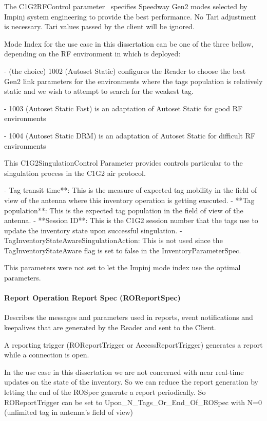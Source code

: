 The C1G2RFControl parameter~\cite[sec. 3.1.4]{ImpinjOctaneLLRP} specifies Speedway Gen2 modes selected by Impinj system engineering to provide the best performance. No Tari adjustment is necessary. Tari values passed by the client will be ignored.

Mode Index for the use case in this dissertation can be one of the three bellow, depending on the RF environment in which is deployed: 

- (the choice) 1002 (Autoset Static) configures the Reader to choose the best Gen2 link parameters for the environments where the tags population is relatively static and we wish to attempt to search for the weakest tag.

- 1003 (Autoset Static Fast) is an adaptation of Autoset Static for good RF environments

- 1004 (Autoset Static DRM) is an adaptation of Autoset Static for difficult RF environments

This C1G2SingulationControl Parameter provides controls particular to the singulation process in the C1G2 air protocol.

- Tag transit time**: This is the measure of expected tag mobility in the field of view of the antenna where this inventory operation is getting executed.
- **Tag population**: This is the expected tag population in the field of view of the antenna.
- **Session ID**: This is the C1G2 session number that the tags use to update the inventory state upon successful singulation.
- TagInventoryStateAwareSingulationAction: This is not used since the TagInventoryStateAware flag is set to false in the InventoryParameterSpec.

This parameters were not set to let the Impinj mode index use the optimal parameters.

\paragraph{Report Operation Report Spec (ROReportSpec)}

Describes the messages and parameters used in reports, event notifications and keepalives that are generated by the Reader and sent to the Client.

A reporting trigger (ROReportTrigger or AccessReportTrigger) generates a report while a connection is open.

In the use case in this dissertation we are not concerned with near real-time updates on the state of the inventory. So we can reduce the report generation by letting the end of the ROSpec generate a report periodically.
So ROReportTrigger can be set to Upon_N_Tags_Or_End_Of_ROSpec with N=0 (unlimited tag in antenna's field of view)~\cite[sec. 14.2.1]{Llrp1standard20101013Pdf}

